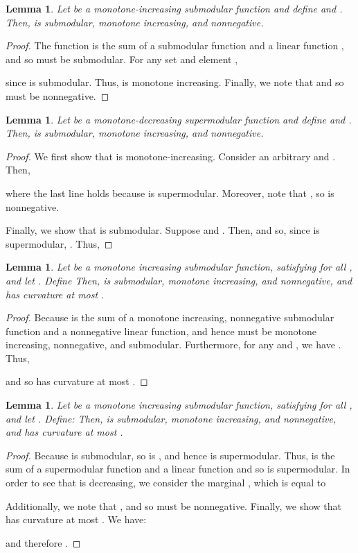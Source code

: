 \documentclass{article}
\newtheorem{lemma}[theorem]{Lemma}
\theoremstyle{definition}
\begin{document}
\begin{lemma}
\label{lem:submod-app}
Let  be a monotone-increasing submodular function and define  and .  Then,  is submodular,  monotone increasing, and nonnegative.
\end{lemma}
\begin{proof}
The function  is the sum of a submodular function  and a linear function , and so must be submodular.  For any set  and element ,

since  is submodular.
Thus,  is monotone increasing.  Finally, we note that  and so  must be nonnegative.
\end{proof}

\begin{lemma}
\label{lem:supmod-app}
Let  be a monotone-decreasing supermodular function and define  and .    Then,  is submodular, monotone increasing, and nonnegative.
\end{lemma}
\begin{proof}
We first show that  is monotone-increasing.  Consider an arbitrary  and .  Then,

where the last line holds because  is supermodular.  Moreover, note that , so  is nonnegative.  

Finally, we show that  is submodular.  Suppose  and .  Then,  and so, since  is supermodular, .  Thus,

\end{proof}

\begin{lemma}
\label{lem:submod-inapprox-curv}
Let  be a monotone increasing submodular function, satisfying  for all , and let .  Define   Then,  is submodular, monotone increasing, and nonnegative, and has curvature at most .
\end{lemma}
\begin{proof}
Because  is the sum of a monotone increasing, nonnegative submodular function and a nonnegative linear function, and hence must be monotone increasing, nonnegative, and submodular.  Furthermore, for any  and , we have .  Thus,

and so  has curvature at most .
\end{proof}

\begin{lemma}
\label{lem:supmod-inapprox-curv}
Let  be a monotone increasing submodular function, satisfying  for all , and let .  Define:
  Then,  is submodular, monotone increasing, and nonnegative, and has curvature at most .
\end{lemma}
\begin{proof}
Because  is submodular, so is , and hence  is supermodular.  Thus,  is the sum of a supermodular function and a linear function and so is supermodular.  In order to see that  is decreasing, we consider the marginal , which is equal to

Additionally, we note that , and so  must be nonnegative.  Finally, we show that  has curvature at most .  We have:

and therefore .
\end{proof}
\end{document}
